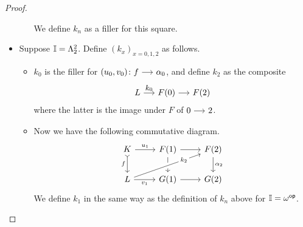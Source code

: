 \documentclass[a4paper,  dvipsnames, 11pt]{amsart}
\begin{document}
\begin{proof}
\begin{itemize}
\begin{itemize}
					We define $k_n$ as a filler for this square.
			\end{itemize}
		\item %
			Suppose $\mathbb{I}=\Lambda^2_2$. Define $(k_x)_{x=0,1,2}$ as follows.
			\begin{itemize}
				\item %
					$k_0$ is the filler for $(u_0,v_0)\colon f \arr \alpha_0$,
					and define $k_2$ as the composite
					\[
						L\arr"k_0"
						F(0)\arr F(2)
					\]
					where the latter is the image under $F$ of $0\arr 2$.
				\item %
					Now we have the following commutative diagram.
					\[
						\begin{tikzcd}
							K
							\ar[r,"u_1"]
							\ar[d,tail,"f"']
								&
								F(1)
								\ar[r]
								\ar[d]
									&
									F(2)
									\ar[d,"\alpha_{2}"]
							\\
							L
							\ar[rru,crossing over,"k_{2}"{description,near end}]
							\ar[r,"v_1"']
								&
								G(1)
								\ar[r]
									&
									G(2)
						\end{tikzcd}
					\]
					We define $k_1$ in the same way as the definition of $k_n$ above for $\mathbb{I}=\omega^{\mathsf{op}}$.
				\qedhere
			\end{itemize}
	\end{itemize}
\end{proof}
\end{document}
